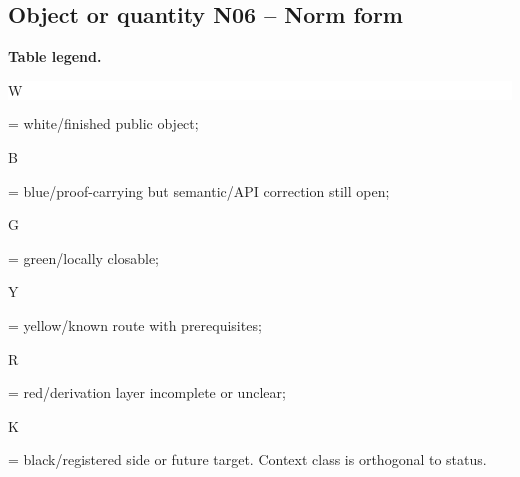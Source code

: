 \subsection*{Object or quantity N06 -- Norm form}
\hypertarget{objproof:N06}{}
\par\smallskip\noindent\begin{minipage}{0.99\linewidth}\footnotesize\raggedright\textbf{Table legend.} \colorbox{white}{\strut W} = white/finished public object; \colorbox{cyan!20}{\strut B} = blue/proof-carrying but semantic/API correction still open; \colorbox{green!18}{\strut G} = green/locally closable; \colorbox{yellow!25}{\strut Y} = yellow/known route with prerequisites; \colorbox{red!20}{\strut R} = red/derivation layer incomplete or unclear; \colorbox{black!18}{\strut K} = black/registered side or future target. Context class is orthogonal to status.\end{minipage}\par\vspace{0.25em}
